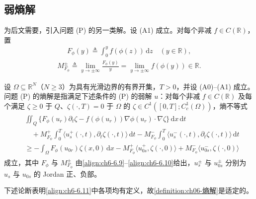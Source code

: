 \documentclass[../../main.tex]{subfiles}%
\begin{document}
\subsection{弱熵解}\label{subsection:ch06-弱熵解}
为后文需要，引入问题 (P) 的另一类解。设 (A1) 成立。对每个非减 $f\in C(\mathbb{R})$，置
\begin{align}
F_\phi(y)\triangleq \int_0^y f(\phi(z))\,\mathrm{d}z \quad(y\in\mathbb{R}), \label{align:ch6-6.9}
\end{align}
\begin{align}
M^\pm_{F_\phi}\triangleq \lim_{y\to\pm\infty}\frac{F_\phi(y)}{y}
=\lim_{y\to\pm\infty}f(\phi(y))\in\mathbb{R}. \label{align:ch6-6.10}
\end{align}
\begin{definition}\label{definition:ch06-熵解}
设 $\Omega\subseteq\mathbb{R}^N$（$N\geqslant3$）为具有光滑边界的有界开集，$T>0$，并设 (A0)--(A1) 成立。问题 (P) 的熵解是指满足下述条件的 (P) 的弱解 $u$：对每个非减 $f\in C(\mathbb{R})$ 及每个满足 $\zeta\geqslant0$ 于 $Q$、$\zeta(\cdot,T)=0$ 于 $\Omega$ 的 $\zeta\in C^1([0,T];C^1_c(\Omega))$，熵不等式
\begin{align}
\begin{aligned}
&\iint_Q\{F_\phi(u_r)\partial_t\zeta-f(\phi(u_r))\nabla\phi(u_r)\cdot\nabla\zeta\}\,\mathrm{d}x\,\mathrm{d}t\\
&\quad+M^+_{F_\phi}\int_0^T\langle u^+_s(\cdot,t),\partial_t\zeta(\cdot,t)\rangle\,\mathrm{d}t
-M^-_{F_\phi}\int_0^T\langle u^-_s(\cdot,t),\partial_t\zeta(\cdot,t)\rangle\,\mathrm{d}t\\
&\geqslant -\int_\Omega F_\phi(u_{0r})\zeta(x,0)\,\mathrm{d}x
-M^+_{F_\phi}\langle u^+_{0s},\zeta(\cdot,0)\rangle
+M^-_{F_\phi}\langle u^-_{0s},\zeta(\cdot,0)\rangle
\end{aligned}
\label{align:ch6-6.11}
\end{align}
成立，其中 $F_\phi$ 与 $M^\pm_{F_\phi}$ 由\eqref{align:ch6-6.9}--\eqref{align:ch6-6.10}给出，$u^\pm_s$ 与 $u^\pm_{0s}$ 分别为 $u_s$ 与 $u_{0s}$ 的 Jordan 正、负部。
\end{definition}

下述论断表明\eqref{align:ch6-6.11}中各项均有定义，故\cref{definition:ch06-熵解}是适定的。
\end{document}
